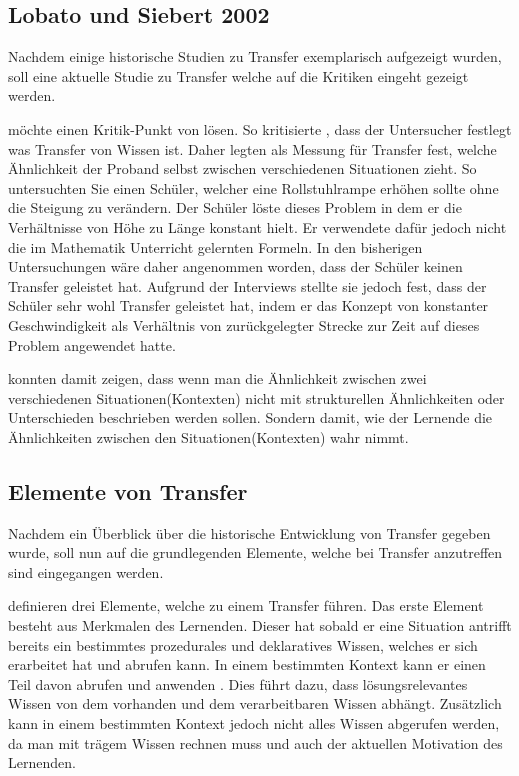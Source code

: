 \subsection{Lobato und Siebert 2002}



Nachdem einige historische Studien zu Transfer exemplarisch aufgezeigt wurden, soll eine aktuelle Studie zu Transfer welche auf die Kritiken eingeht gezeigt werden.


\citet{Lobato2002a} möchte einen Kritik-Punkt von \citet{Lave1988} lösen. So kritisierte \citeauthor{Lave1988}, dass der Untersucher festlegt was Transfer von Wissen ist. Daher legten \citet{Lobato2002a} als Messung für Transfer fest, welche Ähnlichkeit der Proband selbst zwischen verschiedenen Situationen zieht. So untersuchten Sie einen Schüler, welcher eine Rollstuhlrampe erhöhen sollte ohne die Steigung zu verändern. Der Schüler löste dieses Problem in dem er die Verhältnisse von Höhe zu Länge konstant hielt. Er verwendete dafür jedoch nicht die im Mathematik Unterricht gelernten Formeln. In den bisherigen Untersuchungen wäre daher angenommen worden, dass der Schüler keinen Transfer geleistet hat. Aufgrund der Interviews stellte sie jedoch fest, dass der Schüler sehr wohl Transfer geleistet hat, indem er das Konzept von konstanter Geschwindigkeit als Verhältnis von zurückgelegter Strecke zur Zeit auf dieses Problem angewendet hatte.

\citet{Lobato2002a} konnten damit zeigen, dass wenn man die Ähnlichkeit zwischen zwei verschiedenen Situationen(Kontexten) nicht mit strukturellen Ähnlichkeiten oder Unterschieden beschrieben werden sollen. Sondern damit, wie der Lernende die Ähnlichkeiten zwischen den Situationen(Kontexten) wahr nimmt.

\subsection{Elemente von Transfer}

Nachdem ein Überblick über die historische Entwicklung von Transfer gegeben wurde, soll nun auf die grundlegenden Elemente, welche bei Transfer anzutreffen sind eingegangen werden.

\citet{Marini1995} definieren drei Elemente, welche zu einem Transfer führen. Das erste Element besteht aus Merkmalen des Lernenden. Dieser hat sobald er eine Situation antrifft bereits ein bestimmtes prozedurales und deklaratives Wissen, welches er sich erarbeitet hat und abrufen kann. In einem bestimmten Kontext kann er einen Teil davon abrufen und anwenden \citep[siehe Seite 189ff]{Marini1995}. Dies führt dazu, dass lösungsrelevantes Wissen von dem vorhanden und dem verarbeitbaren Wissen abhängt. Zusätzlich kann in einem bestimmten Kontext jedoch nicht alles Wissen abgerufen werden, da man mit trägem Wissen rechnen muss und auch der aktuellen Motivation des Lernenden. 

